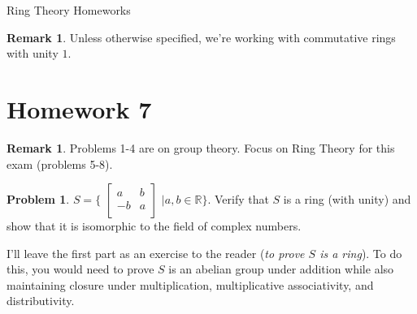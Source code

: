\documentclass[11pt]{article}
\theoremstyle{definition}
\newtheorem{prob}[thm]{Problem}
\newtheorem{rem}[thm]{Remark}
\numberwithin{equation}{section}
\newcommand{\R}{\mathbb{R}}  %
\begin{document}
\begin{center}
{\sf\LARGE Ring Theory Homeworks}
\end{center}

\begin{rem}
Unless otherwise specified, we're working with commutative rings with unity $1$.
\end{rem}

\section{Homework 7}

\begin{rem}
Problems 1-4 are on group theory. Focus on Ring Theory for this exam (problems 5-8).
\end{rem}

\begin{prob}
$S = \{$
$\begin{bmatrix}
a  &b\\
-b &a\\
\end{bmatrix}$
$\mid a, b \in \R\}$. Verify that $S$ is a ring (with unity) and show that it is isomorphic to the field of complex numbers.
\end{prob}

I'll leave the first part as an exercise to the reader (\textit{to prove $S$ is a ring}). To do this, you would need to prove $S$ is an abelian group under addition while also maintaining closure under multiplication, multiplicative associativity, and distributivity.\\
\end{document}
